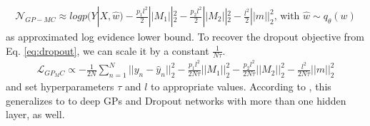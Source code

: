 \documentclass[a4paper,cleardoubleempty,BCOR1cm, 11pt]{report}
\begin{document}
\begin{align*}
\mathcal{N}_{GP-MC} \approx log p(Y|X, \hat{w}) - \frac{p_1 l^2}{2} ||M_1||^2_2 - \frac{p_2 l^2}{2}||M_2||^2_2 - \frac{l^2}{2}||m||^2_2 \text{, with } \hat{w} \sim q_{\theta}(w)
\end{align*}
as approximated log evidence lower bound.
To recover the dropout objective from Eq. \ref{eq:dropout}, we can scale it by a constant $\frac{1}{N \tau}$.
\begin{align*}
\mathcal{L}_{GP_MC} \propto  - \frac{1}{2N} \sum_{n=1}^N ||y_n - \hat{y}_n||^2_2 -  \frac{p_1 l^2}{2N\tau} ||M_1||^2_2 - \frac{p_2 l^2}{2N\tau}||M_2||^2_2 - \frac{l^2}{2N\tau}||m||^2_2
\end{align*}
and set hyperparameters $\tau$ and $l$ to appropriate values. According to \citet{gal2016dropout}, this generalizes to to deep GPs and Dropout networks with more than one hidden layer, as well.
\end{document}
